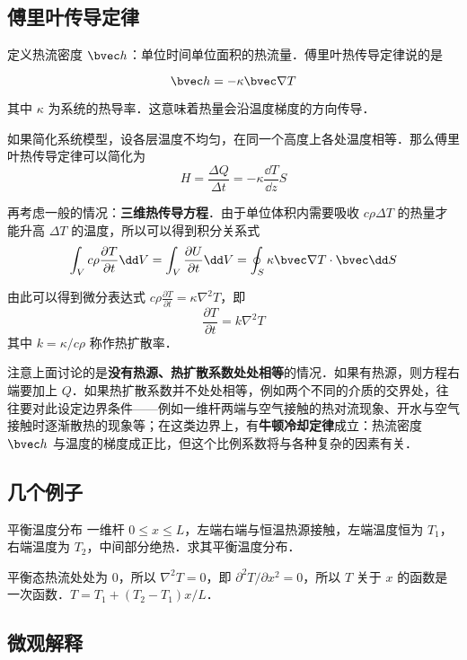 
\subsection{傅里叶传导定律}
定义热流密度 $\bvec h$：单位时间单位面积的热流量．傅里叶热传导定律说的是

\begin{equation}
\bvec h = -\kappa \bvec \nabla T
\end{equation}

其中 $\kappa$ 为系统的热导率．这意味着热量会沿温度梯度的方向传导．

如果简化系统模型，设各层温度不均匀，在同一个高度上各处温度相等．那么傅里叶热传导定律可以简化为
\begin{equation}
H=\frac{\Delta Q}{\Delta t}=-\kappa \frac{\dd T}{\dd z}S
\end{equation}

再考虑一般的情况：\textbf{三维热传导方程}．由于单位体积内需要吸收 $c\rho \Delta T$ 的热量才能升高 $\Delta T$ 的温度，所以可以得到积分关系式
\begin{equation}
\int_V c\rho \frac{\partial T}{\partial t} \dd V = \int_V \frac{\partial U}{\partial t} \dd V= \oint_S \kappa \bvec \nabla T \cdot \bvec \dd S
\end{equation}

由此可以得到微分表达式 $c\rho \frac{\partial T}{\partial t} = \kappa \nabla^2 T$，即
\begin{equation}
\frac{\partial T}{\partial t}=k\nabla^2 T
\end{equation}
其中 $k=\kappa/c\rho$ 称作热扩散率．

注意上面讨论的是\textbf{没有热源、热扩散系数处处相等}的情况．如果有热源，则方程右端要加上 $Q$．如果热扩散系数并不处处相等，例如两个不同的介质的交界处，往往要对此设定边界条件——例如一维杆两端与空气接触的热对流现象、开水与空气接触时逐渐散热的现象等；在这类边界上，有\textbf{牛顿冷却定律}成立：热流密度 $\bvec h$ 与温度的梯度成正比，但这个比例系数将与各种复杂的因素有关．


\subsection{几个例子}
\begin{example}{平衡温度分布}
一维杆 $0\le x\le L$，左端右端与恒温热源接触，左端温度恒为 $T_1$，右端温度为 $T_2$，中间部分绝热．求其平衡温度分布．
\end{example}
平衡态热流处处为 $0$，所以 $\nabla^2 T=0$，即 $\partial^2 T/\partial x^2=0$，所以 $T$ 关于 $x$ 的函数是一次函数．$T=T_1+(T_2-T_1)x/L$．
\subsection{微观解释}